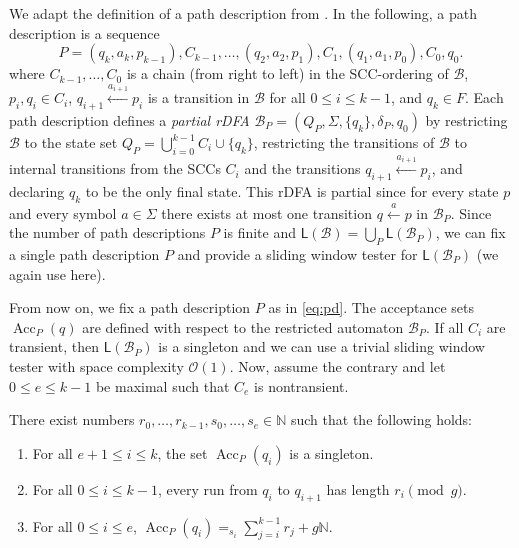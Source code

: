 \documentclass{article}\usepackage[a4paper,margin=20mm]{geometry}
\newcommand{\N}{\mathbb{N}}
\newcommand{\B}{\mathcal{B}}
\renewcommand{\O}{\mathcal{O}}
\renewcommand{\L}{\mathsf{L}}
\DeclareMathOperator{\Acc}{Acc}
\renewcommand{\leq}{\leqslant}
\renewcommand{\le}{\leq}
\begin{document}
We adapt the definition of a path description from .
In the following, a path description is a sequence
\begin{equation}
	\label{eq:pd}
	P = (q_k,a_k,p_{k-1}),C_{k-1},\dots ,(q_2,a_2,p_1),C_1,(q_1,a_1,p_0),C_0,q_0.
\end{equation}
where $C_{k-1}, \dots, C_0$ is a chain (from right to left) in the SCC-ordering of $\B$,
$p_i, q_i \in C_i$, $q_{i+1} \xleftarrow{a_{i+1}} p_i$ is a transition in $\B$
for all $0 \le i \le k-1$, and $q_k \in F$.
Each path description defines a {\em partial rDFA} $\B_P = (Q_P,\Sigma,\{q_k\},\delta_P,q_0)$
by restricting $\B$ to the state set $Q_P = \bigcup_{i=0}^{k-1}C_i \cup \{q_k\}$,
restricting the transitions of $\B$ to internal transitions from the SCCs $C_i$
and the transitions $q_{i+1} \xleftarrow{a_{i+1}} p_i$,
and declaring $q_k$ to be the only final state.
This rDFA is partial since for every state $p$ and every symbol $a \in \Sigma$
there exists at most one transition $q \xleftarrow{a} p$ in $\B_P$.
Since the number of path descriptions $P$ is finite and $\L(\B) = \bigcup_P \L(\B_P)$,
we can fix a single path description $P$ and provide a sliding window tester for $\L(\B_P)$
(we again use  here).

From now on, we fix a path description $P$ as in \eqref{eq:pd}.
The acceptance sets $\Acc_P(q)$ are defined with respect to the restricted automaton $\B_P$. 
If all $C_i$ are transient, then $\L(\B_P)$ is a singleton and we can use a trivial sliding window tester with space complexity $\O(1)$.
Now, assume the contrary and let $0 \le e \le k-1$ be maximal such that $C_e$ is nontransient. 

\begin{lemma} \label{lemma-si-ri}
There exist numbers $r_0, \ldots, r_{k-1}, s_0, \ldots, s_e \in \N$ such that the following holds:
\begin{enumerate}[label=(\roman{*}), ref=(\roman{*})]
\item For all $e+1 \le i \le k$, the set $\Acc_P(q_i)$ is a singleton. \label{item:siri1}
\item For all $0 \le i \le k-1$, every run from $q_i$ to $q_{i+1}$ has length $r_i \pmod g$. \label{item:siri2}
\item For all $0 \le i \le e$, $\Acc_P(q_i) =_{s_i} \sum_{j=i}^{k-1} r_j + g \N$.\label{item:siri3}
\end{enumerate}
\end{lemma}
\end{document}

